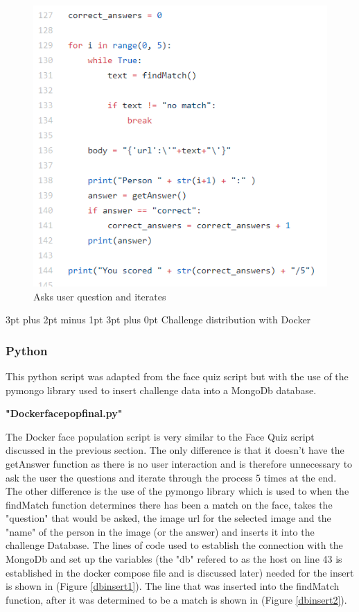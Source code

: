 \documentclass[12pt,a4paper]{article}
\makeatletter
\renewcommand\subsection{\@startsection {subsection}{1}{2mm} %
                               {3pt plus 2pt minus 1pt} %
                               {3pt plus 0pt} %
                               {\normalfont\bfseries}}
\makeatother
\begin{document}
\begin{figure}[h]
    \centering
    \includegraphics[width=1.0\textwidth]{Figs/askquestion.PNG} 
    \caption{Asks user question and iterates} 
    \label{askquestion}
\end{figure} 




\subsection{Challenge distribution with Docker} 
\subsubsection{Python}   
This python script was adapted from the face quiz script but with the use of the pymongo library used to insert challenge data into a MongoDb database. 

\textbf{"Docker\textunderscore face\textunderscore pop\textunderscore final.py"}   

The Docker face population script is very similar to the Face Quiz script discussed in the previous section. The only difference is that it doesn't have the getAnswer function as there is no user interaction and is therefore unnecessary to ask the user the questions and iterate through the process 5 times at the end. The other difference is the use of the pymongo library which is used to when the findMatch function determines there has been a match on the face, takes the "question" that would be asked, the image url for the selected image and the "name" of the person in the image (or the answer) and inserts it into the challenge Database. The lines of code used to establish the connection with the MongoDb and set up the variables (the "db" refered to as the host on line 43 is established in the docker compose file and is discussed later) needed for the insert is shown in (Figure \ref{dbinsert1}). The line that was inserted into the findMatch function, after it was determined to be a match is shown in (Figure \ref{dbinsert2}).
\end{document}

